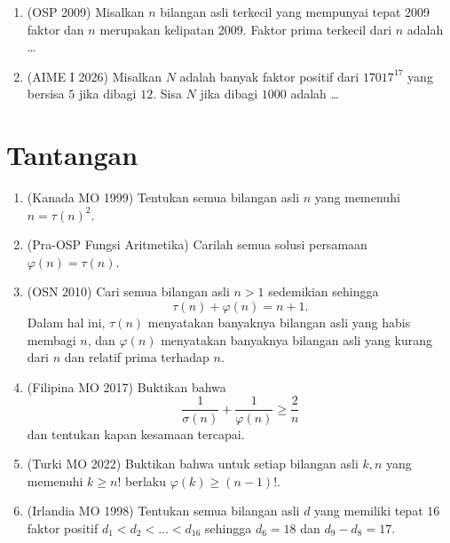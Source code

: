 \documentclass[12pt]{scrartcl}
\begin{document}
\begin{enumerate}[resume]
	\item (OSP 2009)
	Misalkan $n$ bilangan asli terkecil yang mempunyai tepat 2009 faktor
	dan $n$ merupakan kelipatan 2009.
	Faktor prima terkecil dari $n$ adalah \dots

	\item (AIME I 2026)
	Misalkan $N$ adalah banyak faktor positif dari $17017^{17}$ yang bersisa
	$5$ jika dibagi $12$. Sisa $N$ jika dibagi $1000$ adalah \dots

\end{enumerate}

\section{Tantangan}

\begin{enumerate}[resume]

	\item (Kanada MO 1999)
	Tentukan semua bilangan asli $n$ yang memenuhi $n = \tau(n)^2$.

	\item (Pra-OSP Fungsi Aritmetika)
	Carilah semua solusi persamaan $\varphi(n) = \tau(n)$.

	\item (OSN 2010)
	Cari semua bilangan asli $n > 1$ sedemikian sehingga
	\[ \tau(n) + \varphi(n) = n + 1. \]
	Dalam hal ini, $\tau(n)$ menyatakan banyaknya bilangan asli yang habis
	membagi $n$, dan $\varphi(n)$ menyatakan banyaknya bilangan asli yang
	kurang dari $n$ dan relatif prima terhadap $n$.

	\item (Filipina MO 2017)
	Buktikan bahwa
	\[ \frac{1}{\sigma(n)} + \frac{1}{\varphi(n)} \ge \frac{2}{n} \]
	dan tentukan kapan kesamaan tercapai.

	\item (Turki MO 2022)
	Buktikan bahwa untuk setiap bilangan asli $k, n$ yang memenuhi
	$k \ge n!$ berlaku $\varphi(k) \ge (n - 1)!$.

	\item (Irlandia MO 1998)
	Tentukan semua bilangan asli $d$ yang memiliki tepat $16$ faktor positif
	$d_1 < d_2 < \dots < d_{16}$ sehingga $d_6 = 18$ dan $d_9 - d_8 = 17$.

\end{enumerate}
\end{document}
